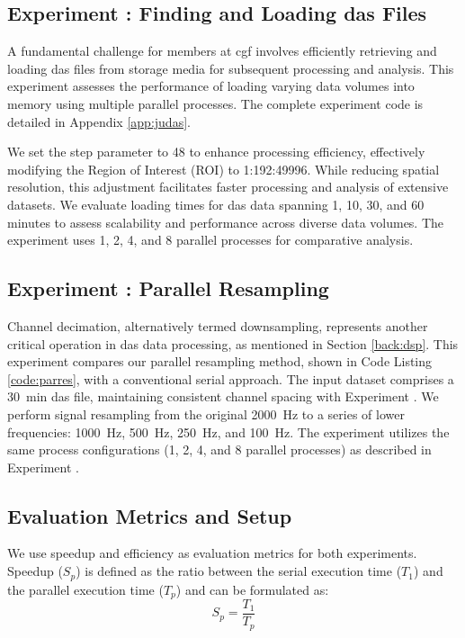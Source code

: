 \subsection{Experiment : Finding and Loading \acrshort{das} Files}
A fundamental challenge for members at \acrshort{cgf} involves efficiently retrieving and loading \acrshort{das} files from storage media for subsequent processing and analysis. This experiment assesses the performance of loading varying data volumes into memory using multiple parallel processes. The complete experiment code is detailed in Appendix \ref{app:judas}.

We set the step parameter to 48 to enhance processing efficiency, effectively modifying the Region of Interest (ROI) to 1:192:49996. While reducing spatial resolution, this adjustment facilitates faster processing and analysis of extensive datasets. We evaluate loading times for \acrshort{das} data spanning 1, 10, 30, and 60 minutes to assess scalability and performance across diverse data volumes. The experiment uses 1, 2, 4, and 8 parallel processes for comparative analysis.

\subsection{Experiment : Parallel Resampling}
Channel decimation, alternatively termed downsampling, represents another critical operation in \acrshort{das} data processing, as mentioned in Section \ref{back:dsp}. This experiment compares our parallel resampling method, shown in Code Listing \ref{code:parres}, with a conventional serial approach. The input dataset comprises a \qty{30}{\minute} \acrshort{das} file, maintaining consistent channel spacing with Experiment . We perform signal resampling from the original \qty{2000}{\hertz} to a series of lower frequencies: \qty{1000}{\hertz}, \qty{500}{\hertz}, \qty{250}{\hertz}, and \qty{100}{\hertz}. The experiment utilizes the same process configurations (1, 2, 4, and 8 parallel processes) as described in Experiment .

\subsection{Evaluation Metrics and Setup}

We use speedup and efficiency as evaluation metrics for both experiments. Speedup ($S_p$) is defined as the ratio between the serial execution time ($T_1$) and the parallel execution time ($T_p$) and can be formulated as:
\begin{equation}
    S_p = \frac{T_1}{T_p}
\end{equation}

